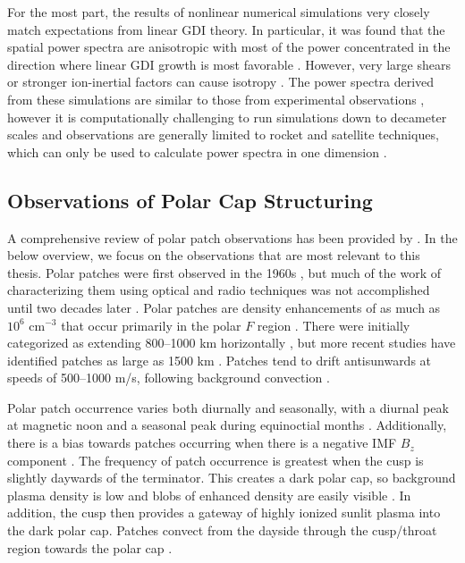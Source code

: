 For the most part, the results of nonlinear numerical simulations very closely match expectations from linear GDI theory.  In particular, it was found that the spatial power spectra are anisotropic with most of the power concentrated in the direction where linear GDI growth is most favorable \citep{Keskinen1981a,Keskinen1981b,Keskinen1982,Gondarenko2001,Gondarenko2004b}.  However, very large shears or stronger ion-inertial factors can cause isotropy \citep{Gondarenko2001,Gondarenko2006}.  The power spectra derived from these simulations are similar to those from experimental observations \citep{Baker1978,Kelley1979}, however it is computationally challenging to run simulations down to decameter scales and observations are generally limited to rocket and satellite techniques, which can only be used to calculate power spectra in one dimension \citep{Villain1986,Moen2012}.


\subsection{Observations of Polar Cap Structuring}
\label{sec:lit_observations}
A comprehensive review of polar patch observations has been provided by \citet{Crowley1996}.  In the below overview, we focus on the observations that are most relevant to this thesis.  Polar patches were first observed in the 1960s \citep{Hill1963}, but much of the work of characterizing them using optical and radio techniques was not accomplished until two decades later \citep{Weber1981,Weber1984,Weber1986,Buchau1983,Buchau1985}.  Polar patches are density enhancements of as much as \(10^6\) cm\(^{-3}\) that occur primarily in the polar \(F\) region \citep{Buchau1983}.  There were initially categorized as extending 800--1000 km horizontally \citep{Weber1984}, but more recent studies have identified patches as large as 1500 km \citep{Hosokawa2014}.  Patches tend to drift antisunwards at speeds of 500--1000 m/s, following background convection \citep{Buchau1983,Weber1984}.

Polar patch occurrence varies both diurnally and seasonally, with a diurnal peak at magnetic noon and a seasonal peak during equinoctial months \citep{Rodger1996}.  Additionally, there is a bias towards patches occurring when there is a negative IMF \(B_z\) component \citep{Buchau1983,Rodger1996}.  The frequency of patch occurrence is greatest when the cusp is slightly daywards of the terminator.  This creates a dark polar cap, so background plasma density is low and blobs of enhanced density are easily visible \citep{Coley1998}.  In addition, the cusp then provides a gateway of highly ionized sunlit plasma into the dark polar cap.  Patches convect from the dayside through the cusp/throat region towards the polar cap \citep{Kelly1984,Foster1984,Foster1985,Foster1993,Sojka1982,delaBeaujardiere1985}.

